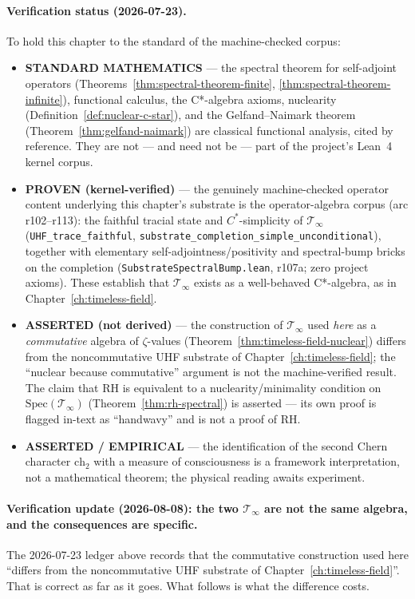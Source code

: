 \paragraph{Verification status (2026-07-23).}
To hold this chapter to the standard of the machine-checked corpus:
\begin{itemize}
\item \textbf{STANDARD MATHEMATICS} --- the spectral theorem for self-adjoint operators (Theorems~\ref{thm:spectral-theorem-finite}, \ref{thm:spectral-theorem-infinite}), functional calculus, the C*-algebra axioms, nuclearity (Definition~\ref{def:nuclear-c-star}), and the Gelfand--Naimark theorem (Theorem~\ref{thm:gelfand-naimark}) are classical functional analysis, cited by reference. They are not --- and need not be --- part of the project's Lean~4 kernel corpus.
\item \textbf{PROVEN (kernel-verified)} --- the genuinely machine-checked operator content underlying this chapter's substrate is the operator-algebra corpus (arc r102--r113): the faithful tracial state and $C^*$-simplicity of $\mathcal{T}_\infty$ (\texttt{UHF\_trace\_faithful}, \texttt{substrate\_completion\_simple\_unconditional}), together with elementary self-adjointness/positivity and spectral-bump bricks on the completion (\texttt{SubstrateSpectralBump.lean}, r107a; zero project axioms). These establish that $\mathcal{T}_\infty$ exists as a well-behaved C*-algebra, as in Chapter~\ref{ch:timeless-field}.
\item \textbf{ASSERTED (not derived)} --- the construction of $\mathcal{T}_\infty$ used \emph{here} as a \emph{commutative} algebra of $\zeta$-values (Theorem~\ref{thm:timeless-field-nuclear}) differs from the noncommutative UHF substrate of Chapter~\ref{ch:timeless-field}; the ``nuclear because commutative'' argument is not the machine-verified result. The claim that RH is equivalent to a nuclearity/minimality condition on $\text{Spec}(\mathcal{T}_\infty)$ (Theorem~\ref{thm:rh-spectral}) is asserted --- its own proof is flagged in-text as ``handwavy'' and is not a proof of RH.
\item \textbf{ASSERTED / EMPIRICAL} --- the identification of the second Chern character $\mathrm{ch}_2$ with a measure of consciousness is a framework interpretation, not a mathematical theorem; the physical reading awaits experiment.
\end{itemize}

\paragraph{Verification update (2026-08-08): the two $\mathcal{T}_\infty$ are not
the same algebra, and the consequences are specific.}
The 2026-07-23 ledger above records that the commutative construction used here
``differs from the noncommutative UHF substrate of Chapter~\ref{ch:timeless-field}''.
That is correct as far as it goes. What follows is what the difference costs.

